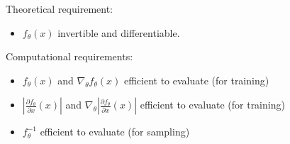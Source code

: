 \documentclass{report}
\begin{document}
\begin{concept}
    Theoretical requirement:

    \begin{itemize}
        \item $f_{\theta}(x)$ invertible and differentiable.
    \end{itemize}

    Computational requirements:

    \begin{itemize}
        \item $f_{\theta}(x)$ and $\nabla_{\theta} f_{\theta}(x)$ efficient to evaluate (for training)
        \item $\left|\frac{\partial f_{\theta}}{\partial x}(x)\right|$ and $\nabla_{\theta}\left|\frac{\partial f_{\theta}}{\partial x}(x)\right|$ efficient to evaluate (for training)
        \item $f_{\theta}^{-1}$ efficient to evaluate (for sampling)
    \end{itemize}
\end{concept}
\end{document}
